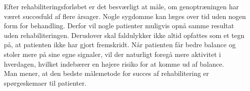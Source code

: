 Efter rehabiliteringsforløbet er det besværligt at måle, om genoptræningen har været succesfuld af flere årsager. Nogle sygdomme kan læges over tid uden nogen form for behandling. Derfor vil nogle patienter muligvis opnå samme resultat uden rehabiliteringen. Derudover skal faldulykker ikke altid opfattes som et tegn på, at patienten ikke har gjort fremskridt. Når patienten får bedre balance og stoler mere på sine egne signaler, vil der naturligt foregå mere aktivitet i hverdagen, hvilket indebærer en højere risiko for at komme ud af balance. \cite{Hain2008} \\
Man mener, at den bedste målemetode for succes af rehabilitering er spørgeskemaer til patienter. \cite{Hain2008}